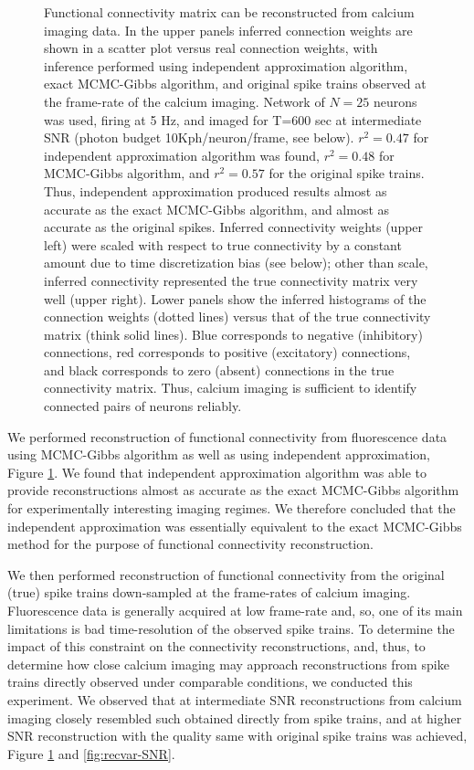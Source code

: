 \begin{figure}[h]
\begin{minipage}[c]{0.3\hsize}
\end{minipage}
\caption{Functional connectivity matrix can be reconstructed from calcium imaging data.
In the upper panels inferred connection weights are shown in a scatter plot versus real connection weights, with inference performed using independent approximation algorithm, exact MCMC-Gibbs algorithm, and original spike trains observed at the frame-rate of the calcium imaging. Network of $N=25$ neurons was used, firing at 5 Hz, and imaged for T=600 sec at intermediate SNR (photon budget 10Kph/neuron/frame, see below).
$r^2=0.47$ for independent approximation algorithm was found, $r^2=0.48$ for MCMC-Gibbs algorithm, and $r^2=0.57$ for the original spike trains. 
Thus, independent approximation produced results almost as accurate as the exact MCMC-Gibbs algorithm, and almost as accurate as the original spikes.
Inferred connectivity weights (upper left) were scaled with respect to true connectivity by a constant amount due to time discretization bias (see below); other than scale, inferred connectivity represented the true connectivity matrix very well (upper right).
Lower panels show the inferred histograms of the connection weights (dotted lines) versus that of the true connectivity matrix (think solid lines). Blue corresponds to negative (inhibitory) connections, red corresponds to positive (excitatory) connections, and black corresponds to zero (absent) connections in the true connectivity matrix.
Thus, calcium imaging is sufficient to identify connected pairs of neurons reliably.}
\label{fig:scatters}
\end{figure}


We performed reconstruction of functional connectivity from fluorescence data using MCMC-Gibbs algorithm as well as using independent approximation, Figure \ref{fig:scatters}. We found that independent approximation algorithm was able to provide reconstructions almost as accurate as the exact MCMC-Gibbs algorithm for experimentally interesting imaging regimes. We therefore concluded that the independent approximation was essentially equivalent to the exact MCMC-Gibbs method for the purpose of functional connectivity reconstruction.

We then performed reconstruction of functional connectivity from the original (true) spike trains down-sampled at the frame-rates of calcium imaging.
Fluorescence data is generally acquired at low frame-rate and, so, one of its main limitations is bad time-resolution of the observed spike trains. To determine the impact of this constraint on the connectivity reconstructions, and, thus, to determine how close calcium imaging may approach  reconstructions from spike trains directly observed under comparable conditions, we conducted this experiment.
We observed that at intermediate SNR reconstructions from calcium imaging closely resembled such obtained directly from spike trains, and at higher SNR reconstruction with the quality same with original spike trains was achieved, Figure \ref{fig:scatters} and \ref{fig:recvar-SNR}.

